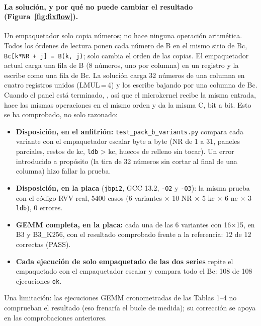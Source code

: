 \paragraph{La solución, y por qué no puede cambiar el resultado (Figura~\ref{fig:fixflow}).} Un empaquetador solo copia números; no
hace ninguna operación aritmética. Todos los órdenes de lectura ponen cada número de B en el mismo sitio de Bc,
\texttt{Bc[k*NR + j] = B(k, j)}; solo cambia el orden de las copias. El empaquetador actual carga una fila de B (8 números, uno por
columna) en un registro y la escribe como una fila de Bc. La solución carga 32 números de una columna en cuatro registros unidos
(LMUL\,=\,4) y los escribe bajando por una columna de Bc. Cuando el panel está terminado, , así
que el microkernel recibe la misma entrada, hace las mismas operaciones en el mismo orden y da la misma C, bit a bit. Esto se ha
comprobado, no solo razonado:
\begin{itemize}
  \item \textbf{Disposición, en el anfitrión:} \texttt{test\_pack\_b\_variants.py} compara cada variante con el empaquetador escalar
  byte a byte (NR de 1 a 31, paneles parciales, restos de kc, \texttt{ldb} > kc, huecos de relleno sin tocar). Un error introducido a
  propósito (la tira de 32 números sin cortar al final de una columna) hizo fallar la prueba.
  \item \textbf{Disposición, en la placa} (\texttt{jbpi2}, GCC 13.2, \texttt{-O2} y \texttt{-O3}): la misma prueba con el código RVV
  real, 5400 casos (6 variantes $\times$ 10 NR $\times$ 5 kc $\times$ 6 nc $\times$ 3 \texttt{ldb}), 0 errores.
  \item \textbf{GEMM completa, en la placa:} cada una de las 6 variantes con 16$\times$15, en B3 y B3\_K256, con el resultado
  comprobado frente a la referencia: 12 de 12 correctas (PASS).
  \item \textbf{Cada ejecución de solo empaquetado de las dos series} repite el empaquetado con el empaquetador escalar y compara todo
  el Bc: 108 de 108 ejecuciones \texttt{ok}.
\end{itemize}
Una limitación: las ejecuciones GEMM cronometradas de las Tablas 1--4 no comprueban el resultado (eso frenaría el bucle de
medida); su corrección se apoya en las comprobaciones anteriores.

